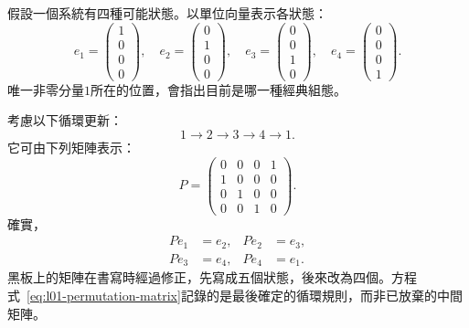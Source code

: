 假設一個系統有四種可能狀態。以單位向量表示各狀態：
\begin{equation}
  e_1=
  \begin{pmatrix}1\\0\\0\\0\end{pmatrix},
  \quad
  e_2=
  \begin{pmatrix}0\\1\\0\\0\end{pmatrix},
  \quad
  e_3=
  \begin{pmatrix}0\\0\\1\\0\end{pmatrix},
  \quad
  e_4=
  \begin{pmatrix}0\\0\\0\\1\end{pmatrix}.
  \label{eq:l01-one-hot}
\end{equation}
唯一非零分量\(1\)所在的位置，會指出目前是哪一種經典組態。

考慮以下循環更新：
\begin{equation}
  1\longrightarrow2\longrightarrow3\longrightarrow4\longrightarrow1.
  \label{eq:l01-four-cycle}
\end{equation}
它可由下列矩陣表示：
\begin{equation}
  P=
  \begin{pmatrix}
    0&0&0&1\\
    1&0&0&0\\
    0&1&0&0\\
    0&0&1&0
  \end{pmatrix}.
  \label{eq:l01-permutation-matrix}
\end{equation}
確實，
\begin{equation}
  \begin{aligned}
    Pe_1&=e_2, & Pe_2&=e_3,\\
    Pe_3&=e_4, & Pe_4&=e_1.
  \end{aligned}
\end{equation}
黑板上的矩陣在書寫時經過修正，先寫成五個狀態，後來改為四個。方程式~\eqref{eq:l01-permutation-matrix}記錄的是最後確定的循環規則，而非已放棄的中間矩陣。

